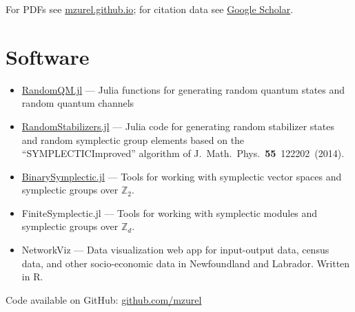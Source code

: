 \documentclass[letterpaper,11pt]{article}
\begin{document}
\nocite{RaussendorfFeldmann2022,ZurelHeimendahl2022,OkayRaussendorf2021,Zurel2020,ZurelRaussendorf2020,RaussendorfZurel2020}
\printbibliography[title={Publications \& preprints}]
For PDFs see \href{mzurel.github.io}{mzurel.github.io}; for citation data see \href{https://scholar.google.com/citations?user=qUA_szUAAAAJ&hl=en&oi=ao}{Google Scholar}.


\section*{Software}
\begin{itemize}[leftmargin=*]
	\item \href{https://github.com/mzurel/RandomQM.jl}{RandomQM.jl} --- Julia functions for generating random quantum states and random quantum channels
	\vspace{-4pt}
	\item \href{https://github.com/mzurel/RandomStabilizers.jl}{RandomStabilizers.jl} --- Julia code for generating random stabilizer states and random symplectic group elements based on the ``SYMPLECTICImproved'' algorithm of J.~Math.~Phys.~\textbf{55}~122202~(2014).
	\vspace{-4pt}
	\item \href{https://github.com/mzurel/BinarySymplectic.jl}{BinarySymplectic.jl} --- Tools for working with symplectic vector spaces and symplectic groups over $\mathbb{Z}_2$.
	\vspace{-4pt}
	\item FiniteSymplectic.jl --- Tools for working with symplectic modules and symplectic groups over $\mathbb{Z}_d$.
	\item NetworkViz --- Data visualization web app for input-output data, census data, and other socio-economic data in Newfoundland and Labrador.  Written in R.
\end{itemize}
Code available on GitHub: \href{https://github.com/mzurel}{github.com/mzurel}

\end{document}
